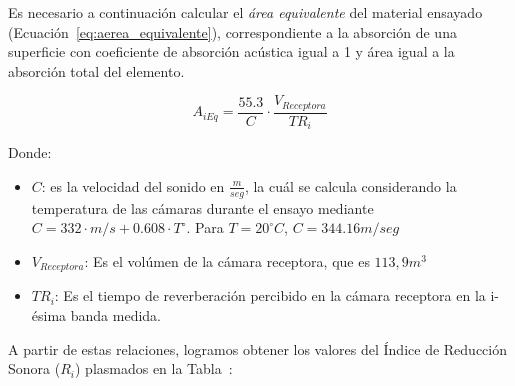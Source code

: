 \par Es necesario a continuación calcular el \textit{área equivalente} del material ensayado (Ecuación~\eqref{eq:aerea_equivalente}), correspondiente a la absorción de una superficie con coeficiente de absorción acústica igual a 1 y área igual a la absorción total del elemento. 

\begin{equation}
    A_{i Eq} =  \frac{55.3}{C} \cdot \frac{V_{Receptora}}{TR_i}
    \label{eq:aerea_equivalente}
\end{equation}

\par Donde:
\begin{itemize}
    \item $C$: es la velocidad del sonido en $\frac{m}{seg}$, la cuál se calcula considerando la temperatura de las cámaras durante el ensayo mediante $C = 332\cdot m/s+ 0.608 \cdot T^{\circ}$. Para $T= 20^{\circ}C$, $C = 344.16 m/seg$
    \item $V_{Receptora}$: Es el volúmen de la cámara receptora, que es $113,9m^3$
    \item $TR_i$: Es el tiempo de reverberación percibido en la cámara receptora en la i-ésima banda medida.
\end{itemize}

\par A partir de estas relaciones, logramos obtener los valores del Índice de Reducción Sonora ($R_i$) plasmados en la Tabla~:

